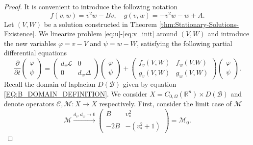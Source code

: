 \documentclass[11pt, a4paper]{article}
\theoremstyle{break}
\theoremstyle{break}
\theoremstyle{break}
\theoremstyle{break}
\theoremstyle{break}
\theoremstyle{break}
\theoremstyle{break}
\theoremstyle{break}
\theoremstyle{break}
\begin{document}
\begin{proof}
    It is convenient to introduce the following notation
    \begin{equation}
        \label{eq:non_linearities}
        f(v, w) = v^2w - Bv, \quad g(v,w) = -v^2w - w + A.
    \end{equation}
    Let $(V, W)$ be a solution constructed in Theorem \ref{thm:Stationary-Solutions-Existence}. We linearize problem \eqref{eq:u}-\eqref{eq:v_init} around $(V, W)$ and introduce the new variables $\varphi = v - V$ and $\psi = w - W$, satisfying the following partial differential equations
    \begin{equation}
        \label{eq:perturbation_evolution_pde}
        \frac{\partial}{\partial t}
        \begin{pmatrix}
            \varphi \\ \psi
        \end{pmatrix}
        =
        \begin{pmatrix}
            d_v \mathcal{L} & 0 \\ 0 & d_w \Delta
        \end{pmatrix}
        \begin{pmatrix}
            \varphi \\ \psi
        \end{pmatrix}
        +
        \begin{pmatrix}
            f_v(V,W) & f_w(V. W) \\ g_v(V,W) & g_w(V,W)
        \end{pmatrix}
        \begin{pmatrix}
            \varphi \\ \psi
        \end{pmatrix}.
    \end{equation}
    Recall the domain of laplacian $D(\mathcal{B})$ given by equation \eqref{EQ:B_DOMAIN_DEFINITION}. We consider $X = C_{0, \Omega}(\mathbb{R}^n) \times D(\mathcal{B})$ and denote operators $\mathcal{C}, \mathcal{M} : X \rightarrow X$ respectively. First, consider the limit case of $\mathcal{M}$
    \begin{equation}
        \label{eq:nonlinearities_limit_case}
        \mathcal{M}
        \xrightarrow{d_v, d_w \rightarrow 0}
        \begin{pmatrix}
            B & v_*^2 \\
            -2B & - (v_*^2 + 1)
        \end{pmatrix}
        =
        \mathcal{M}_0.
    \end{equation}

\end{proof}
\end{document}
